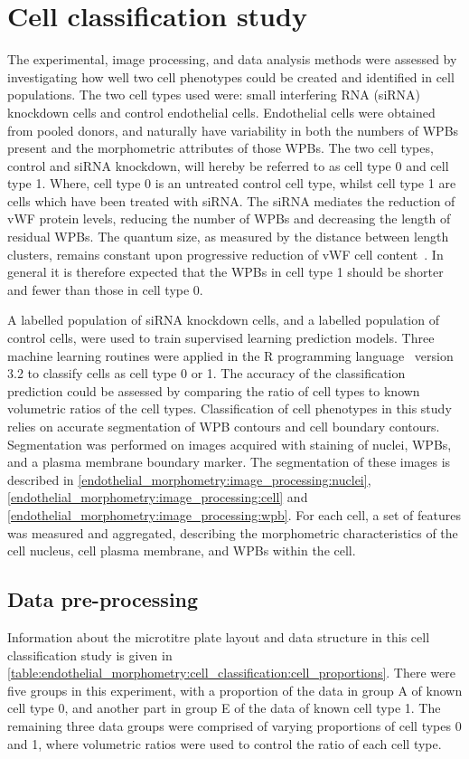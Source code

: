 \section{Cell classification study}
\label{endothelial_morphometry:cell_classification}
The experimental, image processing, and data analysis methods were assessed by investigating how well two cell phenotypes could be created and identified in cell populations. The two cell types used were: small interfering RNA (siRNA) knockdown cells and control endothelial cells. Endothelial cells were obtained from pooled donors, and naturally have variability in both the numbers of WPBs present and the morphometric attributes of those WPBs. The two cell types, control and siRNA knockdown, will hereby be referred to as cell type 0 and cell type 1. Where, cell type 0 is an untreated control cell type, whilst cell type 1 are cells which have been treated with siRNA. The siRNA mediates the reduction of vWF protein levels, reducing the number of WPBs and decreasing the length of residual WPBs. The quantum size, as measured by the distance between length clusters, remains constant upon progressive reduction of vWF cell content~\cite{Ferraro2014}. In general it is therefore expected that the WPBs in cell type 1 should be shorter and fewer than those in cell type 0.

A labelled population of siRNA knockdown cells, and a labelled population of control cells, were used to train supervised learning prediction models. Three machine learning routines were applied in the R programming language~\cite{RCoreTeam2014} version 3.2 to classify cells as cell type 0 or 1. The accuracy of the classification prediction could be assessed by comparing the ratio of cell types to known volumetric ratios of the cell types. Classification of cell phenotypes in this study relies on accurate segmentation of WPB contours and cell boundary contours. Segmentation was performed on images acquired with staining of nuclei, WPBs, and a plasma membrane boundary marker. The segmentation of these images is described in \autoref{endothelial_morphometry:image_processing:nuclei}, \autoref{endothelial_morphometry:image_processing:cell} and \autoref{endothelial_morphometry:image_processing:wpb}. For each cell, a set of features was measured and aggregated, describing the morphometric characteristics of the cell nucleus, cell plasma membrane, and WPBs within the cell.

\subsection{Data pre-processing}
\label{endothelial_morphometry:cell_classification:data_pre-processing}
Information about the microtitre plate layout and data structure in this cell classification study is given in \autoref{table:endothelial_morphometry:cell_classification:cell_proportions}. There were five groups in this experiment, with a proportion of the data in group A of known cell type 0, and another part in group E of the data of known cell type 1. The remaining three data groups were comprised of varying proportions of cell types 0 and 1, where volumetric ratios were used to control the ratio of each cell type.

